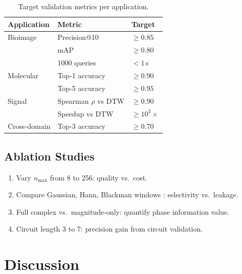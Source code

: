 \documentclass[11pt,twocolumn,a4paper]{article}
\begin{document}
\begin{table}[t]
\centering
\caption{Target validation metrics per application.}
\label{tab:validation}
\begin{tabular}{lll}
\toprule
\textbf{Application} & \textbf{Metric} & \textbf{Target} \\
\midrule
Bioimage & Precision@10 & $\geq 0.85$ \\
         & mAP & $\geq 0.80$ \\
         & 1000 queries & $< 1$\,s \\
\midrule
Molecular & Top-1 accuracy & $\geq 0.90$ \\
          & Top-5 accuracy & $\geq 0.95$ \\
\midrule
Signal & Spearman $\rho$ vs DTW & $\geq 0.90$ \\
       & Speedup vs DTW & $\geq 10^3\times$ \\
\midrule
Cross-domain & Top-3 accuracy & $\geq 0.70$ \\
\bottomrule
\end{tabular}
\end{table}

\subsection{Ablation Studies}

\begin{enumerate}[nosep]
  \item Vary $n_{\max}$ from 8 to 256: quality vs.\ cost.
  \item Compare Gaussian, Hann, Blackman windows \citep{harris1978}:
    selectivity vs.\ leakage.
  \item Full complex vs.\ magnitude-only: quantify phase information
    value.
  \item Circuit length 3 to 7: precision gain from circuit validation.
\end{enumerate}



\section{Discussion}
\label{sec:discussion}
\end{document}
